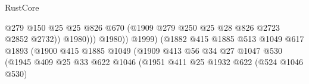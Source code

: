 \begin{lexlean}{RustCore}
\begin{coremodule}
                                                      @279
                                                      @150
                                                      @25
                                                      @25
                                                      @826
                                                      @670
                                                      (@1909
                                                        @279
                                                        @250
                                                        @25
                                                        @28
                                                        @826
                                                        @2723
                                                        @2852
                                                        @2732))
                                                    @1980)))
                                              @1980))
                                          @1999)
                                        (@1882
                                          @415
                                          @1885
                                          @513
                                          @1049
                                          @617
                                          @1893
                                          (@1900
                                            @415
                                            @1885
                                            @1049
                                            (@1909
                                              @413
                                              @56
                                              @34
                                              @27
                                              @1047
                                              @530
                                              (@1945
                                                @409
                                                @25
                                                @33
                                                @622
                                                @1046
                                                (@1951
                                                  @411
                                                  @25
                                                  @1932
                                                  @622
                                                  (@524 @1046 @530)

\end{coremodule}
\end{lexlean}
